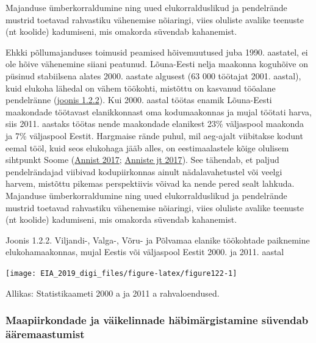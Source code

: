 \documentclass[estonian,]{article}
\begin{document}
\begin{blockquote-right}
Majanduse ümberkorraldumine ning uued elukorralduslikud ja pendelrände
mustrid toetavad rahvastiku vähenemise nõiaringi, viies oluliste avalike
teenuste (nt koolide) kadumiseni, mis omakorda süvendab kahanemist.
\end{blockquote-right}

Ehkki põllumajanduses toimusid peamised hõivemuutused juba 1990. aastatel, ei ole hõive vähenemine siiani peatunud. Lõuna-Eesti nelja maakonna koguhõive on püsinud stabiilsena alates 2000. aastate algusest (63 000 töötajat 2001. aastal), kuid elukoha lähedal on vähem töökohti, mistõttu on kasvanud tööalane pendelränne (\protect\hyperlink{figure122}{joonis 1.2.2}). Kui 2000. aastal töötas enamik Lõuna-Eesti maakondade töötavast elanikkonnast oma kodumaakonnas ja mujal töötati harva, siis 2011. aastaks töötas nende maakondade elanikest 23\% väljaspool maakonda ja 7\% väljaspool Eestit. Hargmaise rände puhul, mil aeg-ajalt viibitakse kodunt eemal tööl, kuid seos elukohaga jääb alles, on eestimaalastele kõige olulisem sihtpunkt Soome (\protect\hyperlink{Annist2017}{Annist 2017}; \protect\hyperlink{Anniste2017}{Anniste jt 2017}). See tähendab, et paljud pendelrändajad viibivad kodupiirkonnas ainult nädalavahetustel või veelgi harvem, mistõttu pikemas perspektiivis võivad ka nende pered sealt lahkuda. Majanduse ümberkorraldumine ning uued elukorralduslikud ja pendelrände mustrid toetavad rahvastiku vähenemise nõiaringi, viies oluliste avalike teenuste (nt koolide) kadumiseni, mis omakorda süvendab kahanemist.

{Joonis 1.2.2.} Viljandi-, Valga-, Võru- ja Põlvamaa elanike töökohtade paiknemine elukohamaakonnas, mujal Eestis või väljaspool Eestit 2000. ja 2011. aastal

\begin{center}\texttt{[image: EIA\_2019\_digi\_files/figure-latex/figure122-1]} \end{center}
\begin{imgsource}
{Allikas:} Statistikaameti 2000 a ja 2011 a rahvaloendused.
\end{imgsource}

\hypertarget{maapiirkondade-ja-vuxe4ikelinnade-huxe4bimuxe4rgistamine-suxfcvendab-uxe4uxe4remaastumist}{%
\subsubsection*{Maapiirkondade ja väikelinnade häbimärgistamine süvendab ääremaastumist}\label{maapiirkondade-ja-vuxe4ikelinnade-huxe4bimuxe4rgistamine-suxfcvendab-uxe4uxe4remaastumist}}
\end{document}
